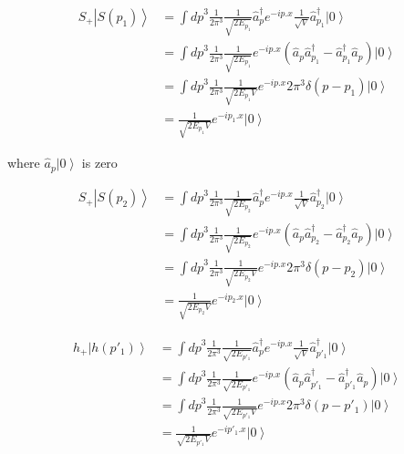\begin{equation}
\begin{split}
S_+ \left| S(p_1) \right \rangle & = \int{ {dp}^3 \frac{1}{2\pi^3} \frac{1}{\sqrt{2E_{p_1}}} \hat{a}_p^\dagger e^{-ip.x} \frac{1}{\sqrt{V}} \hat{a}_{p_1}^\dagger \left | 0 \right \rangle}\\
&=\int {{dp}^3 \frac{1}{2\pi^3} \frac{1}{\sqrt{2E_{p_1}}} e^{-ip.x} (\hat{a}_p \hat{a}_{p_1}^\dagger - \hat{a}_{p_1}^\dagger \hat{a}_p)\left | 0 \right \rangle }\\
&=\int {{dp}^3 \frac{1}{2\pi^3} \frac{1}{\sqrt{2E_{p_1}V}} e^{-ip.x} 2\pi^3 \delta(p-p_1) \left | 0 \right \rangle }\\
&= \frac{1}{\sqrt{2E_{p_1}V}} e^{-ip_1.x} \left | 0 \right \rangle
\end{split}
\end{equation}

where $\hat{a}_p \left | 0 \right \rangle$ is zero

\begin{equation}
\begin{split}
S_+ \left| S(p_2) \right \rangle & = \int{ {dp}^3 \frac{1}{2\pi^3} \frac{1}{\sqrt{2E_{p_2}}} \hat{a}_p^\dagger e^{-ip.x} \frac{1}{\sqrt{V}} \hat{a}_{p_2}^\dagger \left | 0 \right \rangle}\\
&=\int {{dp}^3 \frac{1}{2\pi^3} \frac{1}{\sqrt{2E_{p_2}}} e^{-ip.x} (\hat{a}_p \hat{a}_{p_2}^\dagger - \hat{a}_{p_2}^\dagger \hat{a}_p)\left | 0 \right \rangle }\\
&=\int {{dp}^3 \frac{1}{2\pi^3} \frac{1}{\sqrt{2E_{p_2}V}} e^{-ip.x} 2\pi^3 \delta(p-p_2) \left | 0 \right \rangle }\\
&= \frac{1}{\sqrt{2E_{p_2}V}} e^{-ip_2.x} \left | 0 \right \rangle
\end{split}
\end{equation}

\begin{equation}
\begin{split}
h_+ \left| h(p'_1) \right \rangle & = \int{ {dp}^3 \frac{1}{2\pi^3} \frac{1}{\sqrt{2E_{p'_1}}} \hat{a}_p^\dagger e^{-ip.x} \frac{1}{\sqrt{V}} \hat{a}_{p'_1}^\dagger \left | 0 \right \rangle}\\
&=\int {{dp}^3 \frac{1}{2\pi^3} \frac{1}{\sqrt{2E_{p'_1}}} e^{-ip.x} (\hat{a}_p \hat{a}_{p'_1}^\dagger - \hat{a}_{p'_1}^\dagger \hat{a}_p)\left | 0 \right \rangle }\\
&=\int {{dp}^3 \frac{1}{2\pi^3} \frac{1}{\sqrt{2E_{p'_1}V}} e^{-ip.x} 2\pi^3 \delta(p-p'_1) \left | 0 \right \rangle }\\
&= \frac{1}{\sqrt{2E_{p'_1}V}} e^{-ip'_1.x} \left | 0 \right \rangle
\end{split}
\end{equation}

